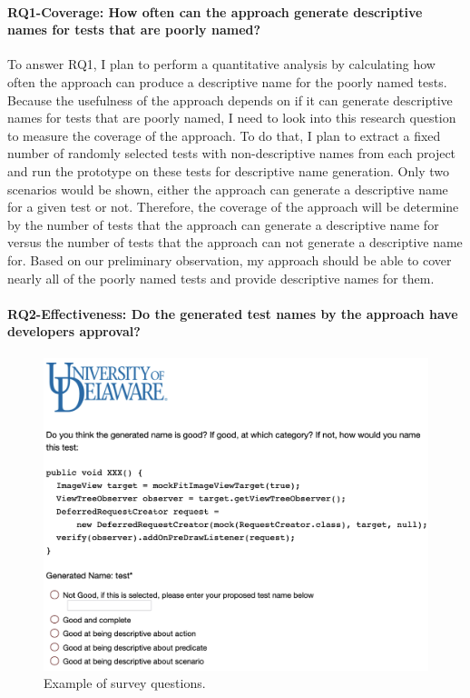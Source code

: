 \paragraph{RQ1-Coverage: How often can the approach generate descriptive names for tests that are poorly named?}

To answer RQ1, I plan to perform a quantitative analysis by calculating how often the approach can produce a descriptive name for the poorly named tests.
%
Because the usefulness of the approach depends on if it can generate descriptive names for tests that are poorly named, I need to look into this research question to measure the coverage of the approach.
%
To do that, I plan to extract a fixed number of randomly selected tests with non-descriptive names from each project and run the prototype on these tests for descriptive name generation.
%
Only two scenarios would be shown, either the approach can generate a descriptive name for a given test or not.
%
Therefore, the coverage of the approach will be determine by the number of tests that the approach can generate a descriptive name for versus the number of tests that the approach can not generate a descriptive name for.
%
Based on our preliminary observation, my approach should be able to cover nearly all of the poorly named tests and provide descriptive names for them.


\paragraph{RQ2-Effectiveness: Do the generated test names by the approach have developers approval?}

\begin{figure}[t]
    \centering
    \includegraphics[scale=0.35]{figures/survey.png}
    \caption{Example of survey questions.}
    \label{fig:survey}
\end{figure}

